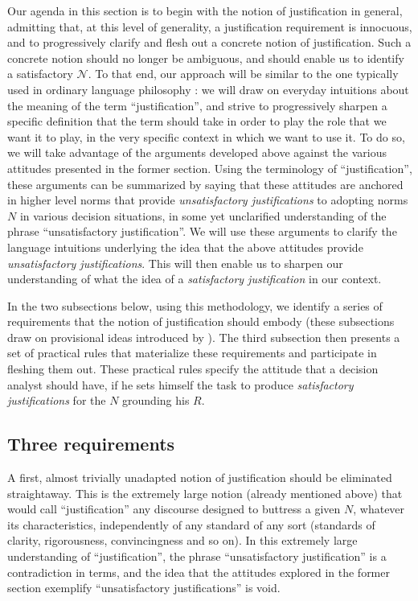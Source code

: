 \documentclass[preprint, french, english, 11pt, authoryear]{elsarticle}%
\newcommand{\adv}{\mathscr{N}}
\begin{document}
Our agenda in this section is to begin with the notion of justification in general, admitting that, at this level of generality, a justification requirement is innocuous, and to progressively clarify and flesh out a concrete notion of justification. Such a concrete notion should no longer be ambiguous, and should enable us to identify a satisfactory $\adv$. To that end, our approach will be similar to the one typically used in ordinary language philosophy \citep{soames_philosophical_2003}: we will draw on everyday intuitions about the meaning of the term ``justification'', and strive to progressively sharpen a specific definition that the term should take in order to play the role that we want it to play, in the very specific context in which we want to use it. To do so, we will take advantage of the arguments developed above against the various attitudes presented in the former section. Using the terminology of ``justification'', these arguments can be summarized by saying that these attitudes are anchored in higher level norms that provide \emph{unsatisfactory justifications} to adopting norms $N$ in various decision situations, in some yet unclarified understanding of the phrase ``unsatisfactory justification''. We will use these arguments to clarify the language intuitions underlying the idea that the above attitudes provide \emph{unsatisfactory justifications}. This will then enable us to sharpen our understanding of what the idea of a \emph{satisfactory justification} in our context.

In the two subsections below, using this methodology, we identify a series of requirements that the notion of justification should embody (these subsections draw on provisional ideas introduced by \citet{meinard_du_2013, meinard_what_2017}). The third subsection then presents a set of practical rules that materialize these requirements and participate in fleshing them out. These practical rules specify the attitude that a decision analyst should have, if he sets himself the task to produce \emph{satisfactory justifications} for the $N$ grounding his $R$.

\subsection{Three requirements}
A first, almost trivially unadapted notion of justification should be eliminated straightaway. This is the extremely large notion (already mentioned above) that would call ``justification'' any discourse designed to buttress a given $N$, whatever its characteristics, independently of any standard of any sort (standards of clarity, rigorousness, convincingness and so on). In this extremely large understanding of ``justification'', the phrase ``unsatisfactory justification'' is a contradiction in terms, and the idea that the attitudes explored in the former section exemplify ``unsatisfactory justifications'' is void.
\end{document}
